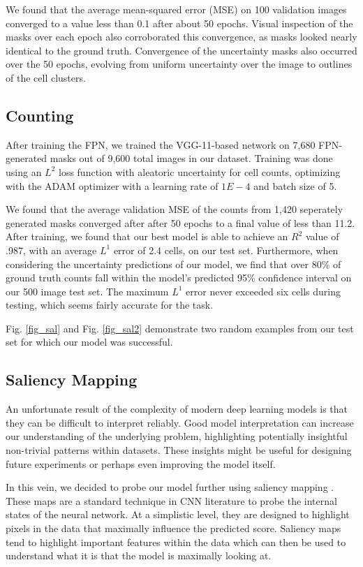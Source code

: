 \documentclass[10pt,twocolumn,letterpaper]{article}
\begin{document}
We found that the average mean-squared error (MSE) on 100 validation images converged to a value less than 0.1 after about 50 epochs.
Visual inspection of the masks over each epoch also corroborated this convergence, as masks looked nearly identical to the ground truth.
Convergence of the uncertainty masks also occurred over the 50 epochs, evolving from uniform uncertainty over the image to outlines of the cell clusters.


\subsection{Counting}

After training the FPN, we trained the VGG-11-based network on 7,680 FPN-generated masks out of 9,600 total images in our dataset.
Training was done using an $L^2$ loss function with aleatoric uncertainty for cell counts, optimizing with the ADAM optimizer with a learning rate of $1E-4$ and batch size of 5.

We found that the average validation MSE of the counts from 1,420 seperately generated masks converged after after 50 epochs
to a final value of less than 11.2.
After training, we found that our best model is able to achieve an $R^2$ value of .987, with an average $L^1$ error of 2.4 cells, on our test set. Furthermore, when considering the uncertainty predictions of our model, we find that over 80\% of ground truth counts fall within the model's predicted 95\% confidence interval on our 500 image test set. The maximum $L^1$ error never exceeded six cells during testing, which seems fairly accurate for the task.

Fig. \ref{fig_sal} and Fig. \ref{fig_sal2} demonstrate two random examples from our test set for which our model was successful.


\subsection{Saliency Mapping}
An unfortunate result of the complexity of modern deep learning models is that they can be difficult to interpret reliably. Good model interpretation can increase our understanding of the underlying problem, highlighting potentially insightful non-trivial patterns within datasets. These insights might be useful for designing future experiments or perhaps even improving the model itself.  

In this vein, we decided to probe our model further using saliency mapping \cite{saliency}. These maps are a standard technique in CNN literature to probe the internal states of the neural network. At a simplistic level, they are designed to highlight pixels in the data that maximally influence the predicted score. Saliency maps tend to highlight important features within the data which can then be used to understand what it is that the model is maximally looking at. 
\end{document}
